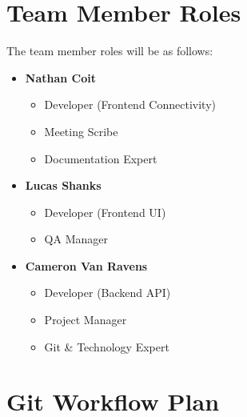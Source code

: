 \documentclass{article}
\begin{document}
\section{Team Member Roles}
The team member roles will be as follows:
\begin{itemize}
    \item \textbf{Nathan Coit}
        \begin{itemize}
            \item Developer (Frontend Connectivity)
            \item Meeting Scribe
            \item Documentation Expert
        \end{itemize}
    \item \textbf{Lucas Shanks}
        \begin{itemize}
            \item Developer (Frontend UI)
            \item QA Manager
        \end{itemize}
    \item \textbf{Cameron Van Ravens}
        \begin{itemize}
            \item Developer (Backend API)
            \item Project Manager
            \item Git \& Technology Expert
        \end{itemize}
\end{itemize}

\section{Git Workflow Plan}
\end{document}
